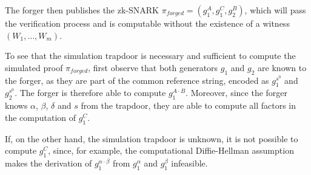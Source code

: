 The forger then publishes the zk-SNARK $\pi_{forged} = (g_1^A, g_1^C, g_2^B)$, which will pass the verification process and is computable without the existence of a witness $(W_1,\ldots,W_m)$.

To see that the simulation trapdoor is necessary and sufficient to compute the simulated proof $\pi_{forged}$, first observe that both generators $g_1$ and $g_2$ are known to the forger, as they are part of the common reference string, encoded as $g_1^{s^0}$ and $g_2^{s^0}$. The forger is therefore able to compute $g_1^{A\cdot B}$. Moreover, since the forger knows $\alpha$, $\beta$, $\delta$ and $s$ from the trapdoor, they are able to compute all factors in the computation of $g_1^C$.

If, on the other hand, the simulation trapdoor is unknown, it is not possible to compute $g_1^C$, since, for example, the computational Diffie-Hellman assumption makes the derivation of $g_1^{\alpha\cdot \beta}$ from $g_1^\alpha$ and $g_1^\beta$ infeasible.

